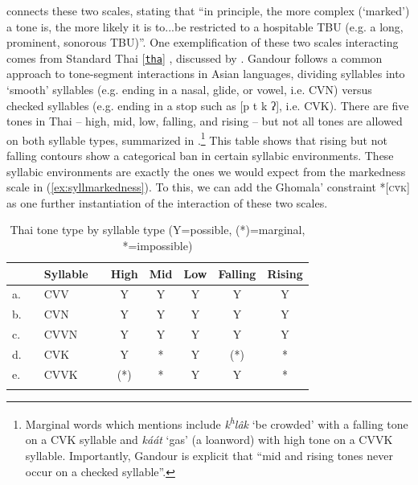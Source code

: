 \documentclass[output=paper,colorlinks,citecolor=brown,draft,draftmode]{langscibook}
\begin{document}
\citet[11]{hyman2007} connects these two scales, stating that ``in principle, the more complex (`marked') a tone is, the more likely it is to...be restricted to a hospitable TBU (e.g. a long, prominent, sonorous TBU)''. 
One exemplification of these two scales interacting comes from  Standard Thai
[\href{https://glottolog.org/resource/languoid/id/thai1261}{\texttt{tha}}]     
\citep{gandour1975representation},
discussed by \citet{yip2002}.
Gandour follows a common approach to tone-segment interactions in Asian languages, dividing syllables into `smooth' syllables (e.g. ending in a nasal, glide, or vowel, i.e. CVN) versus checked syllables (e.g. ending in a stop such as [p t k ʔ], i.e. CVK).
There are five tones in Thai -- high, mid, low, falling, and rising -- but not all tones are allowed on both syllable types, summarized in .\footnote{Marginal words which \citet[172]{gandour1975representation} mentions include \textit{k\textsuperscript{h}l\^{a}k} `be crowded' with a falling tone on a CVK syllable and \textit{káát} `gas' (a loanword) with high tone on a CVVK syllable. Importantly, Gandour is explicit that ``mid and rising tones never occur on a checked syllable''.}
This table shows that rising but not falling contours show a categorical ban in certain syllabic environments. 
These syllabic environments are exactly the ones we would expect from the markedness scale in (\ref{ex:syllmarkedness}).
To this, we can add the Ghomala' constraint *[\textsc{c\v{v}k}] as one further instantiation of the interaction of these two scales. 


\begin{table}
\caption{Thai tone type by syllable type
    (Y=possible,
    (*)=marginal,
    *=impossible) \citep{gandour1975representation}}
\label{tab:thai}
 \begin{tabularx}{\textwidth}{llll CCCCC}
  \lsptoprule
 &  & Syllable &  & High & Mid & Low & Falling & Rising \\
 \midrule
a. &  & CVV &  & Y & Y & Y & Y & Y \\
b. &  & CVN &  & Y & Y & Y & Y & Y \\
c. &  & CVVN &  & Y & Y & Y & Y & Y \\
d. &  & CVK &  & Y & * & Y & (*) & * \\
e. &  & CVVK &  & (*) & * & Y & Y & * \\
\lspbottomrule
\end{tabularx}
\end{table}
\end{document}
